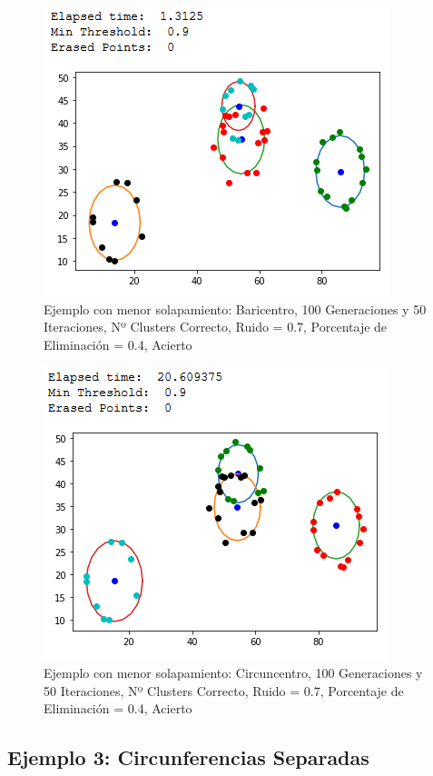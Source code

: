 \documentclass[conference,a4paper]{IEEEtran}
\begin{document}
\begin{figure}[H]
\centering
\includegraphics[scale=0.65]{Experimentacion/EjemploMenorSolapamiento/ejms_b_100_50_re_correct}
\caption{Ejemplo con menor solapamiento: Baricentro, 100 Generaciones y 50 Iteraciones,  Nº Clusters Correcto, Ruido = 0.7, Porcentaje de Eliminación = 0.4, Acierto\\}
\end{figure}

\begin{figure}[H]
\centering
\includegraphics[scale=0.65]{Experimentacion/EjemploMenorSolapamiento/ejms_c_100_50_re_correct}
\caption{Ejemplo con menor solapamiento: Circuncentro, 100 Generaciones y 50 Iteraciones,  Nº Clusters Correcto, Ruido = 0.7, Porcentaje de Eliminación = 0.4, Acierto\\}
\end{figure}

\newpage
\subsection{Ejemplo 3: Circunferencias Separadas}
\end{document}
